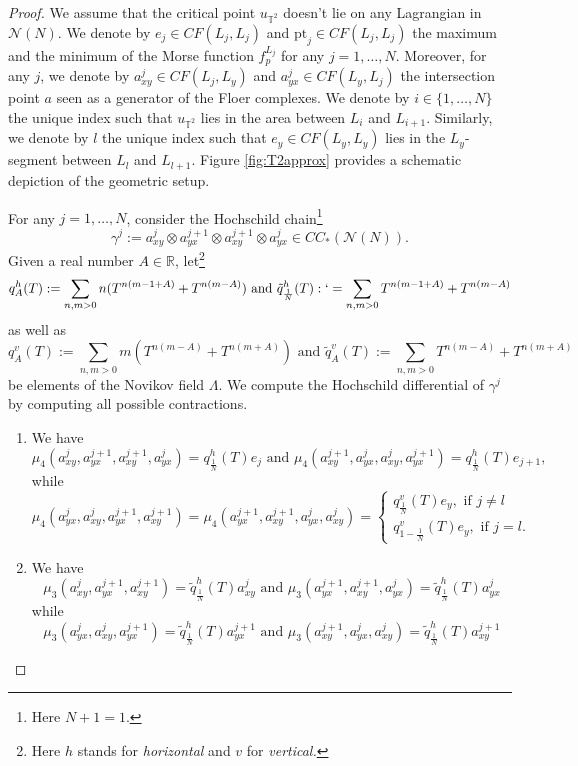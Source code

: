 \begin{proof}
	We assume that the critical point $u_{\mathbb{T}^2}$ doesn't lie on any Lagrangian in $\mathcal{N}(N)$. We denote by $e_j\in CF(L_j,L_j)$ and $\text{pt}_j\in CF(L_j,L_j)$ the maximum and the minimum of the Morse function $f_p^{L_j}$ for any $j=1,\ldots, N$. Moreover, for any $j$, we denote by $a^j_{xy}\in CF(L_j,L_y)$ and $a^j_{yx}\in CF(L_y,L_j)$ the intersection point $a$ seen as a generator of the Floer complexes. We denote by $i\in \{1,\ldots, N\}$ the unique index such that $u_{\mathbb{T}^2}$ lies in the area between $L_i$ and $L_{i+1}$. Similarly, we denote by $l$ the unique index such that $e_y\in CF(L_y,L_y)$ lies in the $L_y$-segment between $L_l$ and $L_{l+1}$. Figure \ref{fig:T2approx} provides a schematic depiction of the geometric setup.
	
	For any $j=1,\ldots, N$, consider the Hochschild chain\footnote{Here $N+1=1$.} $$\gamma^j:=a^j_{xy}\otimes a^{j+1}_{yx}\otimes a^{j+1}_{xy}\otimes a^{j}_{yx}\in CC_*(\mathcal{N}(N)).$$ Given a real number $A\in \mathbb{R}$, let\footnote{Here $h$ stands for \textit{horizontal} and $v$ for \textit{vertical.}} $$q^h_{A}(T):= \sum_{n,m>0}n(T^{n(m-1+A)}+ T^{n(m-A)}) \text{   and   } \tilde{q}^h_{\frac{1}{N}}(T):`= \sum_{n,m>0}T^{n(m-1+A)}+ T^{n(m-A)}$$ as well as 
	$$q^v_A(T):= \sum_{n,m>0}m(T^{n(m-A)}+ T^{n(m+A)}) \text{   and   } \tilde{q}^v_A(T):= \sum_{n,m>0}T^{n(m-A)}+ T^{n(m+A)} $$ be elements of the Novikov field $\Lambda$. We compute the Hochschild differential of $\gamma^j$ by computing all possible contractions. 
	\begin{enumerate}
		\item We have $$\mu_4(a^{j}_{xy},a^{j+1}_{yx}, a^{j+1}_{xy}, a^{j}_{yx}) = q^h_{\frac{1}{N}}(T)e_j\text{   and   } \mu_4(a^{j+1}_{xy},a^{j}_{yx},a^{j}_{xy},a^{j+1}_{yx})= q^h_{\frac{1}{N}}(T)e_{j+1},$$ while $$\mu_4(a^{j}_{yx},a^{j}_{xy},a^{j+1}_{yx}, a^{j+1}_{xy}) = \mu_4(a^{j+1}_{yx},a^{j+1}_{xy},a^{j}_{yx},a^{j}_{xy})= \begin{cases}
			q^v_{\frac{1}{N}}(T) e_y, \text{  if }j\neq l\\
			q^v_{1-\frac{1}{N}}(T)e_y, \text{  if }j=l.
		\end{cases} $$ %
		\item We have $$\mu_3(a^{j}_{xy},a^{j+1}_{yx}, a^{j+1}_{xy}) = \tilde{q}^h_{\frac{1}{N}}(T)a^j_{xy} \text{   and   }\mu_3(a^{j+1}_{yx},a^{j+1}_{xy},a^{j}_{yx}) = \tilde{q}^h_{\frac{1}{N}}(T)a^{j}_{yx}$$
		while $$\mu_3(a^{j}_{yx},a^{j}_{xy},a^{j+1}_{yx}) = \tilde{q}^h_{\frac{1}{N}}(T)a^{j+1}_{yx} \text{   and   }\mu_3(a^{j+1}_{xy},a^j_{yx},a^{j}_{xy}) = \tilde{q}^h_{\frac{1}{N}}(T)a^{j+1}_{xy}$$
		

\end{enumerate}
\end{proof}

